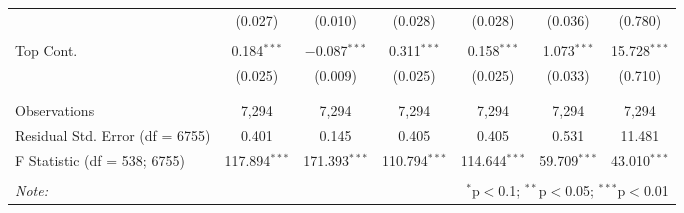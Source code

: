 \begin{table}[!htbp]
\begin{tabular}{@{\extracolsep{5pt}}lcccccc}
  & (0.027) & (0.010) & (0.028) & (0.028) & (0.036) & (0.780) \\ 
  & & & & & & \\ 
 Top Cont. & 0.184$^{***}$ & $-$0.087$^{***}$ & 0.311$^{***}$ & 0.158$^{***}$ & 1.073$^{***}$ & 15.728$^{***}$ \\ 
  & (0.025) & (0.009) & (0.025) & (0.025) & (0.033) & (0.710) \\ 
  & & & & & & \\ 
\hline \\[-1.8ex] 
Observations & 7,294 & 7,294 & 7,294 & 7,294 & 7,294 & 7,294 \\ 
Residual Std. Error (df = 6755) & 0.401 & 0.145 & 0.405 & 0.405 & 0.531 & 11.481 \\ 
F Statistic (df = 538; 6755) & 117.894$^{***}$ & 171.393$^{***}$ & 110.794$^{***}$ & 114.644$^{***}$ & 59.709$^{***}$ & 43.010$^{***}$ \\ 
\hline 
\hline \\[-1.8ex] 
\textit{Note:}  & \multicolumn{6}{r}{$^{*}$p$<$0.1; $^{**}$p$<$0.05; $^{***}$p$<$0.01} \\ 
\end{tabular} 
\end{table} 
